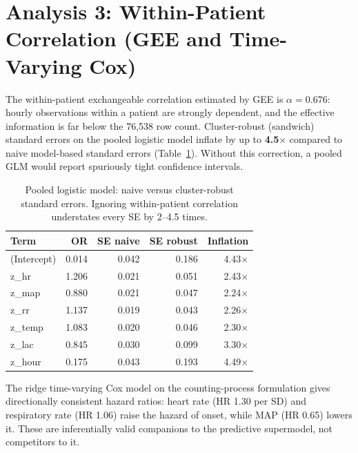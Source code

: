 \section{Analysis 3: Within-Patient Correlation (GEE and Time-Varying Cox)}

The within-patient exchangeable correlation estimated by GEE is
\textbf{$\alpha = 0.676$}: hourly observations within a patient are strongly
dependent, and the effective information is far below the 76{,}538 row count.
Cluster-robust (sandwich) standard errors on the pooled logistic model inflate
by up to \textbf{4.5$\times$} compared to naive model-based standard errors
(Table~\ref{table:gee_se}). Without this correction, a pooled GLM would report
spuriously tight confidence intervals.

\begin{table}[H]
    \centering
    \begin{tabular}{l|r|r|r|r}
        \hline
        \textbf{Term} & \textbf{OR} & \textbf{SE naive} & \textbf{SE robust} & \textbf{Inflation} \\
        \hline\hline
        (Intercept) & 0.014 & 0.042 & 0.186 & 4.43$\times$ \\
        z\_hr       & 1.206 & 0.021 & 0.051 & 2.43$\times$ \\
        z\_map      & 0.880 & 0.021 & 0.047 & 2.24$\times$ \\
        z\_rr       & 1.137 & 0.019 & 0.043 & 2.26$\times$ \\
        z\_temp     & 1.083 & 0.020 & 0.046 & 2.30$\times$ \\
        z\_lac      & 0.845 & 0.030 & 0.099 & 3.30$\times$ \\
        z\_hour     & 0.175 & 0.043 & 0.193 & 4.49$\times$ \\
        \hline
    \end{tabular}
    \caption{Pooled logistic model: naive versus cluster-robust standard
    errors. Ignoring within-patient correlation understates every SE by 2--4.5
    times.}
    \label{table:gee_se}
\end{table}

The ridge time-varying Cox model on the counting-process formulation gives
directionally consistent hazard ratios: heart rate (HR 1.30 per SD) and
respiratory rate (HR 1.06) raise the hazard of onset, while MAP (HR 0.65)
lowers it. These are inferentially valid companions to the predictive
supermodel, not competitors to it.

